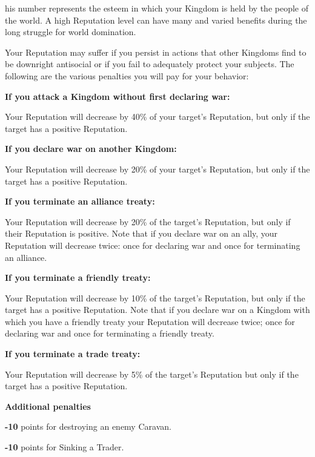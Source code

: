 {

his number represents the esteem in which your Kingdom is held by the people of the world. A high Reputation level can have many and varied benefits during the long struggle for world domination.

Your Reputation may suffer if you persist in actions that other Kingdoms find to be downright antisocial or if you fail to adequately protect your subjects. The following are the various penalties you will pay for your behavior:


\begin{changemargin}{.5cm}{0cm}
\textbf{If you attack a Kingdom without first declaring war:}

Your Reputation will decrease by 40\% of your target’s Reputation, but only if the target has a positive Reputation.

\textbf{If you declare war on another Kingdom:}

Your Reputation will decrease by 20\% of your target’s Reputation, but only if the target has a positive Reputation.

\textbf{If you terminate an alliance treaty:}

Your Reputation will decrease by 20\% of the target’s Reputation, but only if their Reputation is positive. Note that if you declare war on an ally, your Reputation will decrease twice: once for declaring war and once for terminating an alliance.

\textbf{If you terminate a friendly treaty:}


Your Reputation will decrease by 10\% of the target’s Reputation, but only if the target has a positive Reputation. Note that if you declare war on a Kingdom with which you have a friendly treaty your Reputation will decrease twice; once for declaring war and once for terminating a friendly treaty.

\textbf{If you terminate a trade treaty:}

Your Reputation will decrease by 5\% of the target’s Reputation but only if the target has a positive Reputation.

\textbf{Additional penalties}

\textbf{-10} points for destroying an enemy Caravan.

\textbf{-10} points for Sinking a Trader.
\end{changemargin}

}
